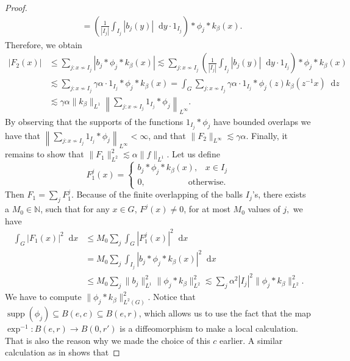 \documentclass[12pt, reqno]{amsart}
\theoremstyle{definition}
\theoremstyle{remark}
\numberwithin{equation}{section}
\newcommand*\diff{\mathop{}\!\mathrm{d}}
\begin{document}
\begin{proof}
\begin{equation*}
\begin{aligned}
    &=\left(\frac{1}{|I_j|}\int_{I_j}|b_j(y)|\diff{y}\cdot1_{I_j}\right)*\phi_j*k_\beta(x).
\end{aligned}
\end{equation*}
Therefore, we obtain
\begin{equation*}
\begin{aligned}
    |F_2(x)|&\leq\sum_{j:x\not\sim I_j}|b_j*\phi_j*k_\beta(x)|\lesssim\sum_{j:x\not\sim I_j}\left(\frac{1}{|I_j|}\int_{I_j}|b_j(y)|\diff{y}\cdot1_{I_j}\right)*\phi_j*k_\beta(x)\\
    &\lesssim\sum_{j:x\not\sim I_j}\gamma\alpha\cdot1_{I_j}*\phi_j*k_\beta(x)=\int_{G}\sum_{j:x\not\sim I_j}\gamma\alpha\cdot1_{I_j}*\phi_j(z)k_\beta(z^{-1}x)\diff{z}\\
    &\lesssim\gamma\alpha\|k_\beta\|_{L^1}\left\|\sum_{j:x\not\sim I_j} 1_{I_j} * \phi_j \right\|_{L^\infty}.
\end{aligned}
\end{equation*}
 By observing that the supports of the functions $1_{I_j}*\phi_j$ have bounded overlaps we have that $\left\|\sum_{j:x\not\sim I_j} 1_{I_j} * \phi_j \right\|_{L^\infty}<\infty$, and that $\|F_2\|_{L^\infty}\lesssim\gamma\alpha$. Finally, it remains to show that $\|F_1\|^2_{L^2}\lesssim\alpha\|f\|_{L^1}$. Let us define
\begin{equation*}
    F^{j}_1(x)=\begin{cases}
   b_j*\phi_j*k_\beta(x), \hspace{10pt}x\in I_j \\
      0,\hspace{60pt} \text{otherwise}.
\end{cases}
\end{equation*}
Then $F_1=\sum_{j}F^{j}_{1}$. Because of the finite overlapping of the balls $I_j$'s, there exists a $M_0\in\mathbb{N}$, such that for any $x\in G$, $F^j(x)\not=0$, for at most $M_0$ values of $j,$ we have 
\begin{equation*}
\begin{aligned}
    \int_{G}|F_1(x)|^2\diff{x}&\leq M_0\sum_{j}\int_{G}|F_1^j(x)|^2\diff{x}\\
    &=M_0\sum_{j}\int_{I_j}|b_j*\phi_j*k_\beta(x)|^2\diff{x}\\
    &\leq M_0\sum_{j}\|b_j\|^2_{L^1}\|\phi_j*k_\beta\|^2_{L^2}\lesssim\sum_{j}\alpha^2|I_j|^2\|\phi_j*k_\beta\|^2_{L^2}.
\end{aligned}
\end{equation*}
We have to compute $\|\phi_j*k_\beta\|_{L^2(G)}^2$. Notice that $\operatorname{supp}(\phi_j)\subseteq B(e,c)\subseteq B(e,r)$, which allows us to use the fact that the map $\exp^{-1}\colon B(e,r)\to B(0,r')$ is a diffeomorphism to make a local calculation. That is also the reason why we made the choice of this $c$ earlier. A similar calculation as in \cite[Theorem 1.1]{5} shows that

\end{proof}
\end{document}

